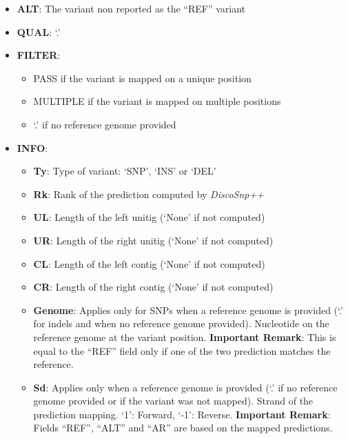 \documentclass{bmcart}
\newcommand{\discopp}{{\it DiscoSnp++}\xspace}
\begin{document}
\begin{itemize}
\begin{itemize}
		\item Else, or if no reference genome provided: the lexicographically smallest of the two variants
	\end{itemize}
	Remark: the REF (and ALT) sequences are extracted from the reference genome is forward strand. If the reverse complement of the prediction is mapped, the reported REF and ALT sequences correspond to the reverse complement of the \discopp predictions.
	\item \textbf{ALT}: The variant non reported as the ``REF'' variant
	\item \textbf{QUAL}: `.'
	\item \textbf{FILTER}: 
	\begin{itemize}
		\item PASS if the variant is mapped on a unique position
		\item MULTIPLE if the variant is mapped on multiple positions
		\item `.' if no reference genome provided
	\end{itemize}
	\item \textbf{INFO}:
	\begin{itemize}
		\item \textbf{Ty}: Type of variant: `SNP', `INS' or `DEL'
		\item \textbf{Rk}: Rank of the prediction computed by \discopp
		\item \textbf{UL}: Length of the left unitig (`None' if not computed)
		\item \textbf{UR}: Length of the right unitig (`None' if not computed)
		\item \textbf{CL}: Length of the left contig (`None' if not computed)
		\item \textbf{CR}: Length of the right contig (`None' if not computed)
		\item \textbf{Genome}: Applies only for SNPs when a reference genome is provided (`.' for indels and when no reference genome provided). Nucleotide on the reference genome at the variant position.   \textbf{Important Remark}: This is equal to the ``REF'' field only if one of the two prediction matches the reference.
		\item \textbf{Sd}: Applies only when a reference genome is provided (`.' if no reference genome provided or if the variant was not mapped). Strand of the prediction mapping. `1': Forward, `-1': Reverse. \textbf{Important Remark}: Fields ``REF'', ``ALT'' and ``AR'' are based on the mapped predictions. %
		

\end{itemize}
\end{itemize}
\end{document}
